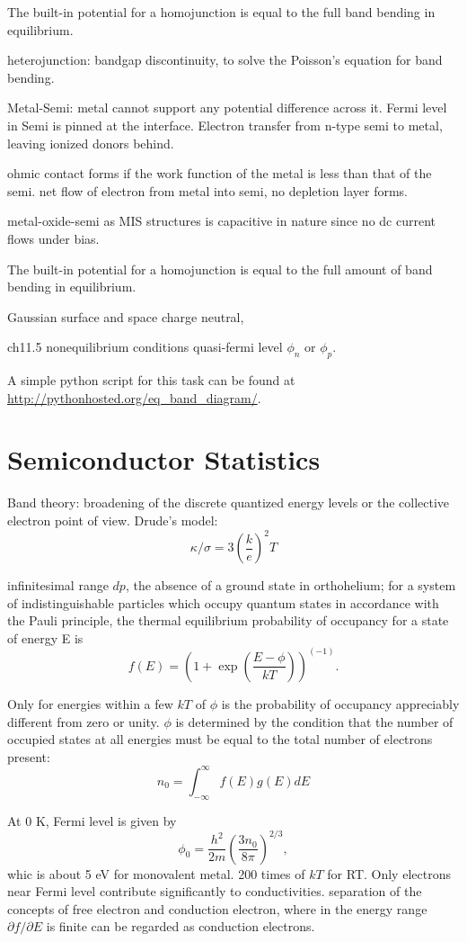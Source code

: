 The built-in potential for a homojunction is equal to the full band bending in equilibrium.

heterojunction: bandgap discontinuity, to solve the Poisson's equation for band bending.

Metal-Semi: metal cannot support any potential difference across it. Fermi level in Semi is pinned at the interface. Electron transfer from n-type semi to metal, leaving ionized donors behind.

ohmic contact forms if the work function of the metal is less than that of the semi. net flow of electron from metal into semi, no depletion layer forms.

metal-oxide-semi as MIS structures is capacitive in nature since no dc current flows under bias.

The built-in potential for a homojunction is equal to the full amount of band bending in equilibrium. 

Gaussian surface and space charge neutral, 

ch11.5 nonequilibrium conditions
quasi-fermi level $\phi_n$ or $\phi_p$.

A simple python script for this task can be found at \url{http://pythonhosted.org/eq_band_diagram/}. 


\section{Semiconductor Statistics}

Band theory: broadening of the discrete quantized energy levels or the collective electron point of view. 
Drude's model:
\[
\kappa/\sigma = 3 (\frac{k}{e})^2T
\]

infinitesimal range $dp$, the absence of a ground state in orthohelium; for a system of indistinguishable particles which occupy quantum states in accordance with the Pauli principle, the thermal equilibrium probability of occupancy for a state of energy E is 
\[
f(E) = (1+\exp(\frac{E-\phi}{kT}))^(-1).
\]

Only for energies within a few $kT$ of $\phi$ is the probability of occupancy appreciably different from zero or unity. $\phi$ is determined by the condition that the number of occupied states at all energies must be equal to the total number of electrons present:
\[
n_0 = \int_{-\infty}^{\infty} f(E)g(E)dE
\]

At 0 K, Fermi level is given by 
\[
\phi_0 = \frac{h^2}{2m}(\frac{3n_0}{8\pi})^{2/3},
\]
whic is about 5 eV for monovalent metal. 200 times of $kT$ for RT. Only electrons near Fermi level contribute significantly to conductivities. separation of the concepts of free electron and conduction electron, where in the energy range $\partial f/\partial E$ is finite can be regarded as conduction electrons. 

